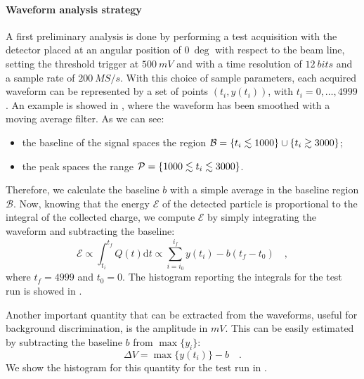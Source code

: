 \documentclass[../../main/main.tex]{subfiles}
\begin{document}
\paragraph{Waveform analysis strategy}
A first preliminary analysis is done by performing a test acquisition with the detector placed at an angular position of \( 0 \ \si{\deg} \) with respect to the beam line, setting the threshold trigger at \( 500 \ \si{mV} \) and with a time resolution of \( 12 \ \si{bits} \) and a sample rate of \( 200 \ \si{MS/s} \).
With this choice of sample parameters, each acquired waveform can be represented by a set of points \( (t_{i},y(t_{i})) \), with \( t_{i}=0,\dots,4999 \). An example is showed in , where the waveform has been smoothed with a moving average filter. As we can see:
\begin{itemize}
    \item the baseline of the signal spaces the region \( \mathcal{B} = \qty{t_{i} \lesssim 1000} \cup \qty{t_{i} \gtrsim 3000} \);
    \item the peak spaces the range \( \mathcal{P} = \qty{ 1000 \lesssim t_{i} \lesssim 3000} \).
\end{itemize}
Therefore, we calculate the baseline \( b \) with a simple average in the baseline region \( \mathcal{B} \). Now, knowing that the energy \( \mathcal{E} \) of the detected particle is proportional to the integral of the collected charge, we compute \( \mathcal{E} \) by simply integrating the waveform and subtracting the baseline:
\begin{equation}
    \mathcal{E}
    \propto
    \int_{t_{i}}^{t_{f}} Q(t) \mathrm{d}t
    \propto
    \sum_{i=i_{0}}^{i_{f}} y(t_{i}) - b(t_{f}-t_{0})
    \quad ,
    \label{eq:preliminary_ssb_baseline}
\end{equation}
where \( t_{f} = 4999 \) and \( t_{0} = 0 \). The histogram reporting the integrals for the test run is showed in .

Another important quantity that can be extracted from the waveforms, useful for background discrimination, is the amplitude in \( \si{mV} \). This can be easily estimated by subtracting the baseline \( b \) from \( \max\{ y_{i} \} \):
\begin{equation}
    \Delta V
    =
    \max\{ y(t_{i}) \} - b
    \quad .
    \label{eq:preliminary_ssb_amplitudes}
\end{equation}
We show the histogram for this quantity for the test run in .
\end{document}
